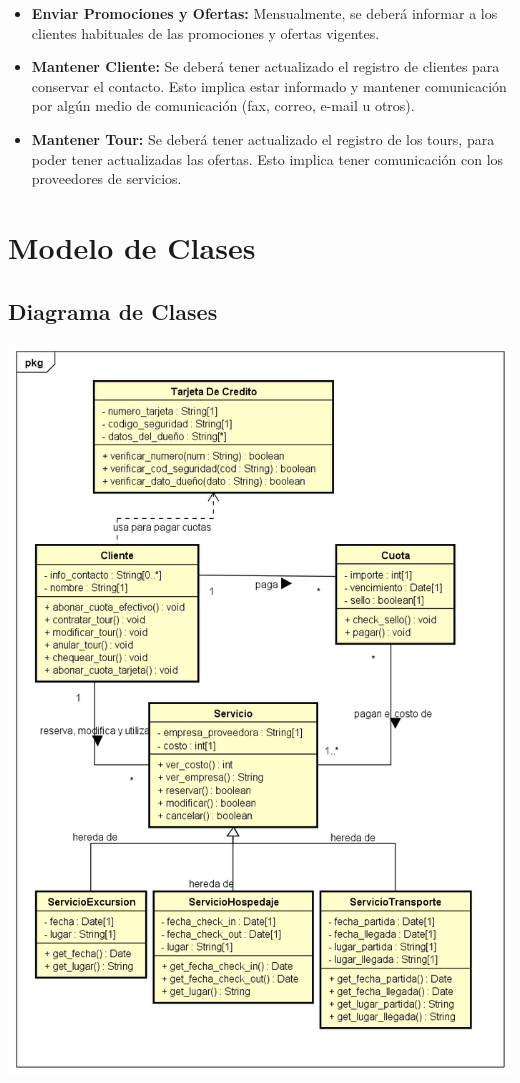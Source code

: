 \documentclass[12pt,a4paper]{article}
\begin{document}
\begin{itemize}
			\item \textbf{Enviar Promociones y Ofertas:} Mensualmente, se deberá informar a los clientes habituales de las promociones y ofertas vigentes.

			\item \textbf{Mantener Cliente:} Se deberá tener actualizado el registro de clientes para conservar el contacto. Esto implica estar informado y mantener comunicación por algún medio de comunicación (fax, correo, e-mail u otros). 

			\item \textbf{Mantener Tour:} Se deberá tener actualizado el registro de los tours, para poder tener actualizadas las ofertas. Esto implica tener comunicación con los proveedores de servicios.
		\end{itemize}

\section{Modelo de Clases}
	\subsection{Diagrama de Clases}
		\includegraphics[scale=0.75]{diagramaDeClases.png}
\end{document}

